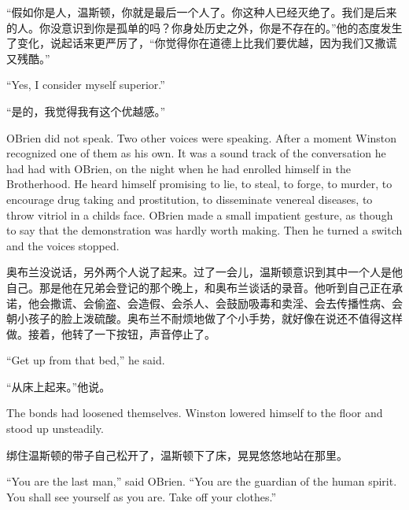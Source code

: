 \begin{paracol}{2}
\switchcolumn

``假如你是人，温斯顿，你就是最后一个人了。你这种人已经灭绝了。我们是后来的人。你没意识到你是孤单的吗？你身处历史之外，你是不存在的。''他的态度发生了变化，说起话来更严厉了，``你觉得你在道德上比我们要优越，因为我们又撒谎又残酷。''

\switchcolumn*

``Yes, I consider myself superior.''

\switchcolumn

``是的，我觉得我有这个优越感。''

\switchcolumn*

O\textquotesingle Brien did not speak. Two other voices were speaking.
After a moment Winston recognized one of them as his own. It was a sound
track of the conversation he had had with O\textquotesingle Brien, on
the night when he had enrolled himself in the Brotherhood. He heard
himself promising to lie, to steal, to forge, to murder, to encourage
drug taking and prostitution, to disseminate venereal diseases, to throw
vitriol in a child\textquotesingle s face. O\textquotesingle Brien made
a small impatient gesture, as though to say that the demonstration was
hardly worth making. Then he turned a switch and the voices stopped.

\switchcolumn

奥布兰没说话，另外两个人说了起来。过了一会儿，温斯顿意识到其中一个人是他自己。那是他在兄弟会登记的那个晚上，和奥布兰谈话的录音。他听到自己正在承诺，他会撒谎、会偷盗、会造假、会杀人、会鼓励吸毒和卖淫、会去传播性病、会朝小孩子的脸上泼硫酸。奥布兰不耐烦地做了个小手势，就好像在说还不值得这样做。接着，他转了一下按钮，声音停止了。

\switchcolumn*

``Get up from that bed,'' he said.

\switchcolumn

``从床上起来。''他说。

\switchcolumn*

The bonds had loosened themselves. Winston lowered himself to the floor
and stood up unsteadily.

\switchcolumn

绑住温斯顿的带子自己松开了，温斯顿下了床，晃晃悠悠地站在那里。

\switchcolumn*

``You are the last man,'' said O\textquotesingle Brien. ``You are the
guardian of the human spirit. You shall see yourself as you are. Take
off your clothes.''


\end{paracol}
